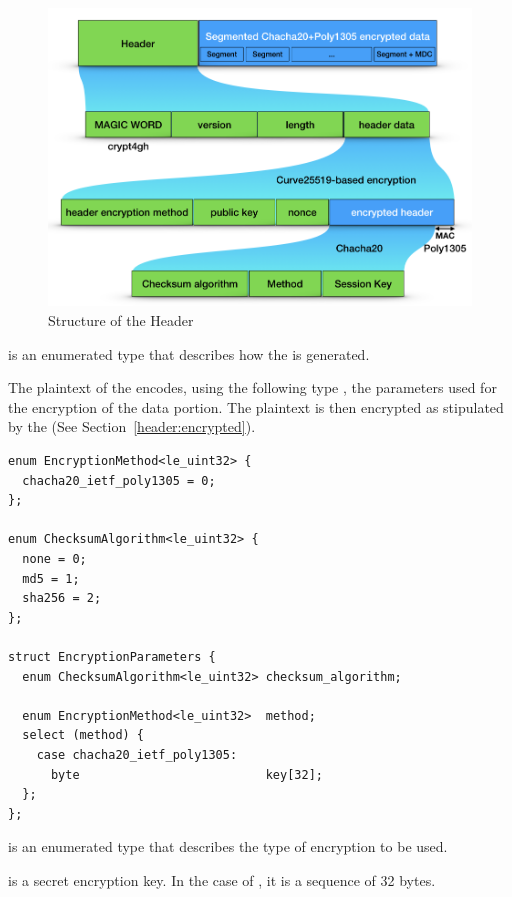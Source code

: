 \begin{figure}
 \centering
 \includegraphics[width=\textwidth]{sections/encryption.png}
 \caption{Structure of the Header}
 \label{figure:header:structure}
\end{figure}


 is an enumerated type that describes how the  is generated.

The plaintext of the  encodes, using the following type , the parameters used for the encryption of the data portion.
%
The plaintext is then encrypted as stipulated by the  (See Section~\ref{header:encrypted}).

\begin{verbatim}
enum EncryptionMethod<le_uint32> {
  chacha20_ietf_poly1305 = 0;
};

enum ChecksumAlgorithm<le_uint32> {
  none = 0;
  md5 = 1;
  sha256 = 2;
};

struct EncryptionParameters {
  enum ChecksumAlgorithm<le_uint32> checksum_algorithm;

  enum EncryptionMethod<le_uint32>  method;
  select (method) {
    case chacha20_ietf_poly1305:
      byte                          key[32];
  };
};
\end{verbatim}

 is an enumerated type that describes the type of encryption to be used.

 is a secret encryption key.
%
In the case of , it is a sequence of 32 bytes.

